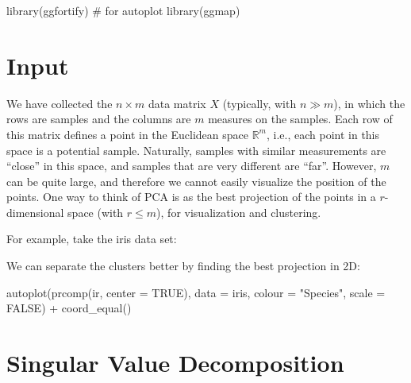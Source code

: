 \documentclass[
  letterpaper,
  DIV=11,
  numbers=noendperiod]{scrreprt}
\newenvironment{Shaded}{\begin{snugshade}}{\end{snugshade}}
\newcommand{\NormalTok}[1]{\textcolor[rgb]{0.00,0.23,0.31}{#1}}
\begin{document}
\begin{Shaded}
\begin{Highlighting}[]
\NormalTok{library(ggfortify) \# for autoplot}
\NormalTok{library(ggmap)}
\end{Highlighting}
\end{Shaded}

\section{Input}\label{input}

We have collected the \(n \times m\) data matrix \(X\) (typically, with
\(n \gg m\)), in which the rows are samples and the columns are \(m\)
measures on the samples. Each row of this matrix defines a point in the
Euclidean space \(\mathbb R^m\), i.e., each point in this space is a
potential sample. Naturally, samples with similar measurements are
``close'' in this space, and samples that are very different are
``far''. However, \(m\) can be quite large, and therefore we cannot
easily visualize the position of the points. One way to think of PCA is
as the best projection of the points in a \(r\)-dimensional space (with
\(r \leq m\)), for visualization and clustering.

For example, take the iris data set:

\begin{Shaded}
\end{Shaded}

We can separate the clusters better by finding the best projection in
2D:

\begin{Shaded}
\begin{Highlighting}[]
\NormalTok{autoplot(prcomp(ir, center = TRUE), }
\NormalTok{         data = iris, }
\NormalTok{         colour = "Species",}
\NormalTok{         scale = FALSE) + }
\NormalTok{  coord\_equal()}
\end{Highlighting}
\end{Shaded}

\section{Singular Value
Decomposition}\label{singular-value-decomposition}
\end{document}
